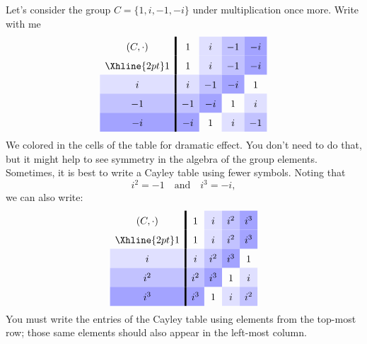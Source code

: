 \documentclass{ximera}
\begin{document}
\begin{example}\label{E:CC}
  Let's consider the group $C =\{1,i,-1,-i\}$ under multiplication
  once more.  Write with me
  \[
  \renewcommand{\arraystretch}{1.6}
  \begin{array}{c!{\vline width 2pt}cccccc}
    (C,\cdot)& 1     & i\cellcolor{blue!12!white}     & -1\cellcolor{blue!24!white}    & -i\cellcolor{blue!36!white}  \\  \Xhline{2pt}
    1        & 1     & i\cellcolor{blue!12!white}     & -1\cellcolor{blue!24!white}    & -i\cellcolor{blue!36!white}  \\  
    i\cellcolor{blue!12!white}        & i\cellcolor{blue!12!white}     & -1\cellcolor{blue!24!white}    & -i\cellcolor{blue!36!white}    & 1   \\  
    -1\cellcolor{blue!24!white}       & -1\cellcolor{blue!24!white}    & -i\cellcolor{blue!36!white}    & 1     & i\cellcolor{blue!12!white}   \\  
    -i\cellcolor{blue!36!white}       & -i\cellcolor{blue!36!white}    & 1     & i\cellcolor{blue!12!white}     & -1\cellcolor{blue!24!white}  
  \end{array}
  \]
  We colored in the cells of the table for dramatic effect. You don't
  need to do that, but it might help to see symmetry in the algebra of
  the group elements.  Sometimes, it is best to write a Cayley table
  using fewer symbols.  Noting that
  \[
  i^2 = -1 \quad\text{and}\quad i^3 = -i,
  \]
  we can also write:
  \[
  \renewcommand{\arraystretch}{1.6}
  \begin{array}{c!{\vline width 2pt}cccccc}
    (C,\cdot)& 1     & i\cellcolor{blue!12!white}     & i^2\cellcolor{blue!24!white}    & i^3\cellcolor{blue!36!white}  \\  \Xhline{2pt}
    1        & 1     & i\cellcolor{blue!12!white}     & i^2\cellcolor{blue!24!white}    & i^3\cellcolor{blue!36!white}  \\  
    i\cellcolor{blue!12!white}        & i\cellcolor{blue!12!white}     & i^2\cellcolor{blue!24!white}    & i^3\cellcolor{blue!36!white}    & 1   \\  
    i^2\cellcolor{blue!24!white}       & i^2\cellcolor{blue!24!white}    & i^3\cellcolor{blue!36!white}    & 1     & i\cellcolor{blue!12!white}   \\  
    i^3\cellcolor{blue!36!white}       & i^3\cellcolor{blue!36!white}    & 1     & i\cellcolor{blue!12!white}     & i^2\cellcolor{blue!24!white}  
  \end{array}
  \]
  You must write the entries of the Cayley table using elements from
  the top-most row; those same elements should also appear in the
  left-most column.
\end{example}
\end{document}

